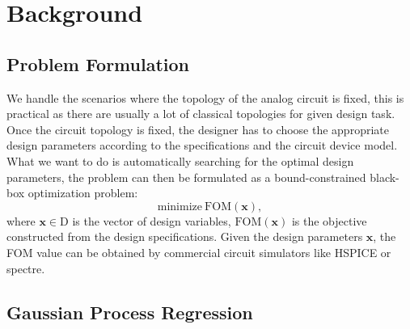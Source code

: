 \section{Background}


\subsection{Problem Formulation}


We handle the scenarios where the topology of the analog circuit is fixed, this
is practical as there are usually a lot of classical topologies for given
design task. Once the circuit topology is fixed, the designer has to choose the
appropriate design parameters according to the specifications and the circuit
device model. What we want to do is automatically searching for the optimal
design parameters, the problem can then be formulated as a bound-constrained
black-box optimization problem:
\begin{equation}
    \label{eq:Formulation}
    \text{minimize}~\mathrm{FOM}(\bm{x}), 
\end{equation}
where $\bm{x} \in \textrm{D}$ is the vector of design variables,
$\mathrm{FOM}(\bm{x})$ is the objective constructed from the design
specifications. Given the design parameters $\bm{x}$, the FOM value can be
obtained by commercial circuit simulators like HSPICE or spectre.



\subsection{Gaussian Process Regression}


